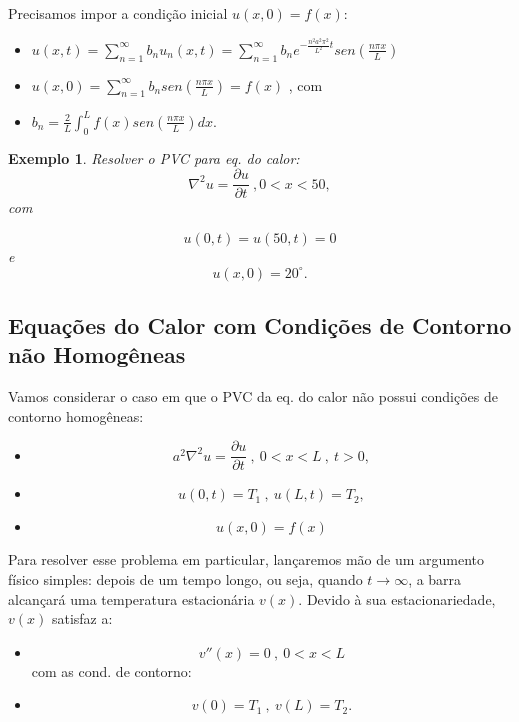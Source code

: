 \documentclass[a4paper,portuguese,9pt,final]{extarticle}
\newtheorem{example}{Exemplo}[section]
\providecommand{\sin}{} \renewcommand{\sin}{sen}
\begin{document}
\begin{multicols*}{2}
        Precisamos impor a condição inicial $u(x,0)=f(x)$:
        \begin{itemize}
            \item[] $ \displaystyle u(x,t)=\sum_{n=1}^{\infty} b_{n} u_{n}(x,t) = \sum_{n=1}^{\infty} b_{n}e^{-\frac{n^{2}a^{2}\pi^{2}}{L^{2}}t} \sin \left(\frac{n \pi x}{L}\right) $
            \item[] $ \displaystyle u(x,0)= \sum_{n=1}^{\infty} b_{n} \sin \left(\frac{n \pi x}{L}\right) = f(x) $ , com
            \item[] $ \displaystyle b_{n}=\frac{2}{L} \int_{0}^{L} f(x) \sin \left(\frac{n \pi x}{L}\right) dx. $
        \end{itemize}

        \begin{example}	
            \setlength{\jot}{10pt}
            Resolver o PVC para eq. do calor:
                $$\nabla^{2} u=\frac{\partial u }{\partial t} \ , 0<x<50,$$ com 

                $$u(0,t) = u(50,t) =0$$  e $$u(x,0) = 20^{\circ}.$$ 
        \end{example}

        \subsection{Equações do Calor com Condições de Contorno não Homogêneas}

        Vamos considerar o caso em que o PVC da eq. do calor não possui condições de contorno homogêneas:
        \begin{itemize}
            \item[] $$a^{2}\nabla^{2}u=\frac{\partial u}{\partial t} \ , \ 0<x<L \ , \ t>0,$$
            \item[] $$u(0,t)=T_{1} \ , \ u(L,t)=T_{2},$$
            \item[] $$u(x,0) = f(x)$$
        \end{itemize}

        Para resolver esse problema em particular, lançaremos mão de um argumento físico simples: depois de um tempo longo, ou seja, quando $t\to \infty$, a barra alcançará uma temperatura estacionária $ v(x) $. Devido à sua estacionariedade, $v(x)$ satisfaz a:
        \begin{itemize}
            \item[] $$v''(x)=0 \ , \ 0<x<L$$ com as cond. de contorno:
            \item[] $$v(0)=T_{1} \ , \ v(L)=T_{2}.$$
        \end{itemize}


\end{multicols*}
\end{document}
